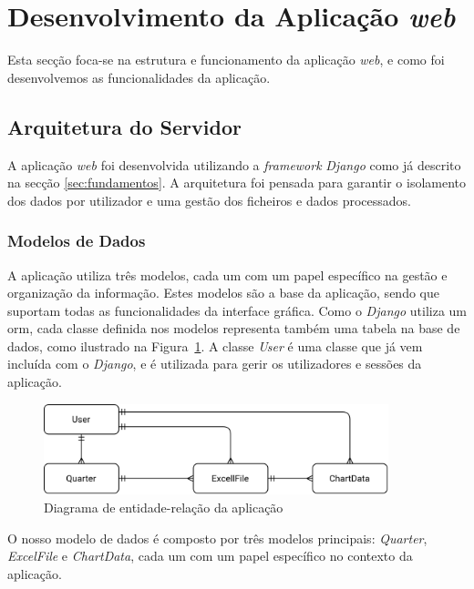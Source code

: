 \section{Desenvolvimento da Aplicação \textit{web}}

Esta secção foca-se na estrutura e funcionamento da aplicação \textit{web}, e como foi desenvolvemos as funcionalidades da aplicação.

\subsection{Arquitetura do Servidor}

A aplicação \textit{web} foi desenvolvida utilizando a \textit{framework} \textit{Django} como já descrito na secção \ref{sec:fundamentos}. A arquitetura foi pensada para garantir o isolamento dos dados por utilizador e uma gestão dos ficheiros e dados processados.

\subsubsection{Modelos de Dados}

A aplicação utiliza três modelos, cada um com um papel específico na gestão e organização da informação. Estes modelos são a base da aplicação, sendo que suportam todas as funcionalidades da interface gráfica. Como o \textit{Django} utiliza um \gls{orm}, cada classe definida nos modelos representa também uma tabela na base de dados, como ilustrado na Figura~\ref{fig:er-diagram}. A classe \textit{User} é uma classe que já vem incluída com o \textit{Django}, e é utilizada para gerir os utilizadores e sessões da aplicação.

\begin{figure}[H]
    \centering
    \includegraphics[max width=10cm]{./img/er-diagram.png}
 \caption{Diagrama de entidade-relação da aplicação}
 \label{fig:er-diagram}
 \end{figure}


O nosso modelo de dados é composto por três modelos principais: \textit{Quarter}, \textit{ExcelFile} e \textit{ChartData}, cada um com um papel específico no contexto da aplicação.


